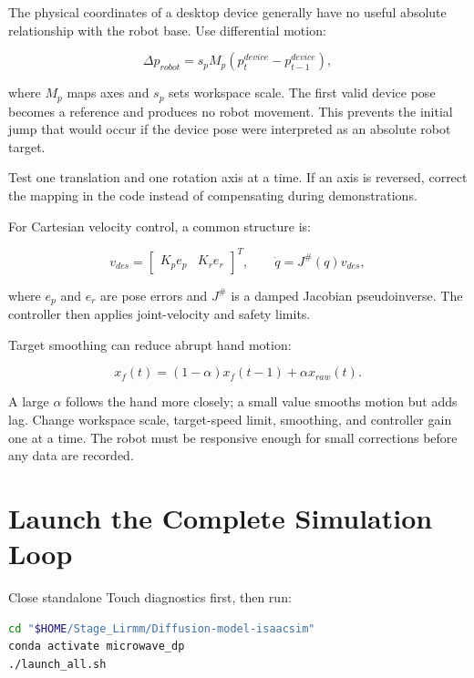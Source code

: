 The physical coordinates of a desktop device generally have no useful absolute
relationship with the robot base. Use differential motion:

\begin{equation}
  \Delta p_{robot} = s_p M_p
  \left(p^{device}_{t}-p^{device}_{t-1}\right),
\end{equation}

where $M_p$ maps axes and $s_p$ sets workspace scale. The first valid device
pose becomes a reference and produces no robot movement. This prevents the
initial jump that would occur if the device pose were interpreted as an
absolute robot target.

Test one translation and one rotation axis at a time. If an axis is reversed,
correct the mapping in the code instead of compensating during demonstrations.

For Cartesian velocity control, a common structure is:

\begin{equation}
  v_{des} =
  \begin{bmatrix}K_p e_p & K_r e_r\end{bmatrix}^{T},
  \qquad
  \dot q = J^{\#}(q)v_{des},
\end{equation}

where $e_p$ and $e_r$ are pose errors and $J^{\#}$ is a damped Jacobian
pseudoinverse. The controller then applies joint-velocity and safety limits.

Target smoothing can reduce abrupt hand motion:

\begin{equation}
  x_f(t)=(1-\alpha)x_f(t-1)+\alpha x_{raw}(t).
\end{equation}

A large $\alpha$ follows the hand more closely; a small value smooths motion but
adds lag. Change workspace scale, target-speed limit, smoothing, and controller
gain one at a time. The robot must be responsive enough for small corrections
before any data are recorded.

\section{Launch the Complete Simulation Loop}

Close standalone Touch diagnostics first, then run:

\begin{lstlisting}[language=bash]
cd "$HOME/Stage_Lirmm/Diffusion-model-isaacsim"
conda activate microwave_dp
./launch_all.sh
\end{lstlisting}

